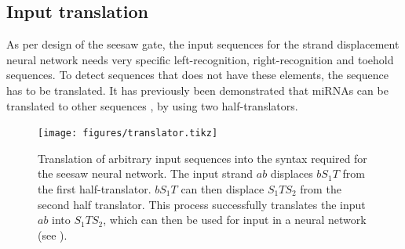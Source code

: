 \subsection{Input translation}

As per design of the seesaw gate, the input sequences for the strand displacement neural network needs very specific left-recognition, right-recognition and toehold sequences. To detect sequences that does not have these elements, the sequence has to be translated. It has previously been demonstrated that miRNAs can be translated to other sequences \cite{Picuri2009}, by using two half-translators.

\begin{figure}[H]
    \texttt{[image: figures/translator.tikz]}
\caption{Translation of arbitrary input sequences into the syntax required for the seesaw neural network. The input strand $ab$ displaces $bS_1T$ from the first half-translator. $bS_1T$ can then displace $S_1TS_2$ from the second half translator. This process successfully translates the input $ab$ into $S_1TS_2$, which can then be used for input in a neural network (see ).}
\label{translator}
\end{figure}
